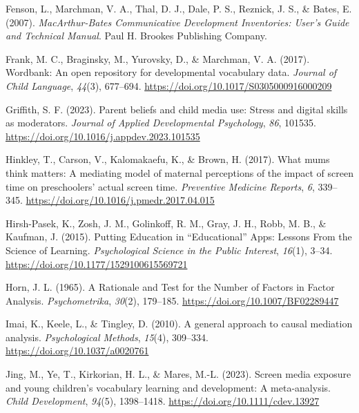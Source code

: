 \documentclass[
  man,
  floatsintext,
  longtable,
  nolmodern,
  notxfonts,
  notimes,
  colorlinks=true,linkcolor=blue,citecolor=blue,urlcolor=blue]{apa7}
\newlength{\cslhangindent}
\newenvironment{CSLReferences}[2] %
 {\begin{list}{}{%
  \setlength{\itemindent}{0pt}
  \setlength{\leftmargin}{0pt}
  \setlength{\parsep}{0pt}
  \ifodd #1
   \setlength{\leftmargin}{\cslhangindent}
   \setlength{\itemindent}{-1\cslhangindent}
  \fi
  \setlength{\itemsep}{#2\baselineskip}}}
 {\end{list}}
\begin{document}
\begin{CSLReferences}{1}{0}
Fenson, L., Marchman, V. A., Thal, D. J., Dale, P. S., Reznick, J. S.,
\& Bates, E. (2007). \emph{{MacArthur-Bates Communicative Development
Inventories}: {User}'s {Guide} and {Technical Manual}}. Paul H. Brookes
Publishing Company.

Frank, M. C., Braginsky, M., Yurovsky, D., \& Marchman, V. A. (2017).
Wordbank: An open repository for developmental vocabulary data.
\emph{Journal of Child Language}, \emph{44}(3), 677--694.
\url{https://doi.org/10.1017/S0305000916000209}

Griffith, S. F. (2023). Parent beliefs and child media use: {Stress} and
digital skills as moderators. \emph{Journal of Applied Developmental
Psychology}, \emph{86}, 101535.
\url{https://doi.org/10.1016/j.appdev.2023.101535}

Hinkley, T., Carson, V., Kalomakaefu, K., \& Brown, H. (2017). What mums
think matters: {A} mediating model of maternal perceptions of the impact
of screen time on preschoolers' actual screen time. \emph{Preventive
Medicine Reports}, \emph{6}, 339--345.
\url{https://doi.org/10.1016/j.pmedr.2017.04.015}

Hirsh-Pasek, K., Zosh, J. M., Golinkoff, R. M., Gray, J. H., Robb, M.
B., \& Kaufman, J. (2015). Putting {Education} in {``{Educational}''}
{Apps}: {Lessons From} the {Science} of {Learning}. \emph{Psychological
Science in the Public Interest}, \emph{16}(1), 3--34.
\url{https://doi.org/10.1177/1529100615569721}

Horn, J. L. (1965). A {Rationale} and {Test} for the {Number} of
{Factors} in {Factor Analysis}. \emph{Psychometrika}, \emph{30}(2),
179--185. \url{https://doi.org/10.1007/BF02289447}

Imai, K., Keele, L., \& Tingley, D. (2010). A general approach to causal
mediation analysis. \emph{Psychological Methods}, \emph{15}(4),
309--334. \url{https://doi.org/10.1037/a0020761}

Jing, M., Ye, T., Kirkorian, H. L., \& Mares, M.-L. (2023). Screen media
exposure and young children's vocabulary learning and development: {A}
meta-analysis. \emph{Child Development}, \emph{94}(5), 1398--1418.
\url{https://doi.org/10.1111/cdev.13927}


\end{CSLReferences}
\end{document}
